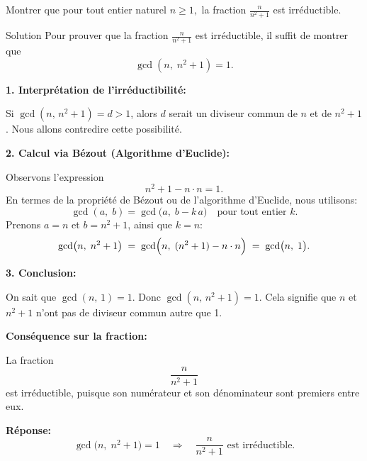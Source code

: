 \documentclass[a4paper,12pt]{article}
\begin{document}
\begin{exercice}[title=Exercice 11 $\quad \star \star \quad$ {[Calculer, Raisonner, Chercher]}]
Montrer que pour tout entier naturel $n\ge1,$ la fraction $\frac{n}{n^2+1}$ est irréductible.
\end{exercice}
\begin{solutionbox}{Solution}
    Pour prouver que la fraction $\frac{n}{n^2+1}$ est irréductible, il suffit de montrer que
    $$
    \gcd(n,\;n^2+1) = 1.
    $$
    
    \textbf{1. Interprétation de l'irréductibilité:}
    
    Si $\gcd(n,\,n^2+1)=d>1$, alors $d$ serait un diviseur commun de $n$ et de $n^2+1$. Nous allons contredire cette possibilité.
    
    \textbf{2. Calcul via Bézout (Algorithme d'Euclide):}
    
    Observons l'expression
    $$
    n^2+1 - n\cdot n = 1.
    $$
    En termes de la propriété de Bézout ou de l'algorithme d'Euclide, nous utilisons:
    $$
    \gcd(a,\;b) = \gcd\bigl(a,\;b - k\,a\bigr)\quad\text{pour tout entier }k.
    $$
    Prenons $a=n$ et $b=n^2+1$, ainsi que $k=n$:
    $$
    \gcd\bigl(n,\;n^2+1\bigr)
    \;=\;
    \gcd\Bigl(n,\;(n^2+1)-n\cdot n\Bigr)
    \;=\;
    \gcd\bigl(n,\;1\bigr).
    $$
    
    \textbf{3. Conclusion:}
    
    On sait que $\gcd(n,\,1)=1$. Donc $\gcd(n,\,n^2+1)=1$. Cela signifie que $n$ et $n^2+1$ n'ont pas de diviseur commun autre que 1.
    
    \textbf{Conséquence sur la fraction:}
    
    La fraction
    $$
    \frac{n}{n^2+1}
    $$
    est irréductible, puisque son numérateur et son dénominateur sont premiers entre eux.
    
    \medskip
    \textbf{Réponse:}
    $$
    \gcd\bigl(n,\;n^2+1\bigr)=1\quad\Longrightarrow\quad \frac{n}{n^2+1}\text{ est irréductible.}
    $$
    \end{solutionbox}
% 
% 
\end{document}
